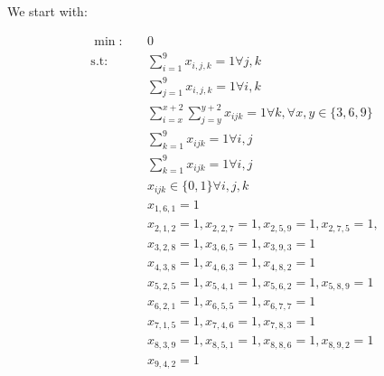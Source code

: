 \documentclass{report}
\begin{document}
We start with: 


\begin{align*}
\min_{}: \quad & 0 \\
\text{s.t}: \quad & \sum_{i=1}^{9} x_{i,j,k} = 1 \forall j, k \\ %
		  & \sum_{j=1}^{9} x_{i,j,k} = 1 \forall i,k \\%
		  & \sum_{i=x}^{x+2} \sum_{j=y}^{y+2} x_{ijk} = 1\forall k, \forall x,y \in \{3,6,9\} \\
		  & \sum_{k=1}^{9} x_{ijk} = 1 \forall i,j\\ %
		  & \sum_{k=1}^{9} x_{ijk} = 1 \forall i,j\\
		  & x_{ijk} \in \{0,1\} \forall i,j,k\\ 
	&x_{1,6,1} = 1 \\ 
	&x_{2,1,2} = 1, 
	x_{2,2,7} = 1,
	x_{2,5,9} = 1, 
	x_{2,7,5} = 1, \\
	&x_{3,2,8} = 1, 
	x_{3,6,5} = 1,
	x_{3,9,3} = 1\\ 
	&x_{4,3,8} = 1, 
	x_{4,6,3} = 1,
	x_{4,8,2} = 1 \\
	&x_{5,2,5} = 1,
	x_{5,4,1} = 1, 
	x_{5,6,2} = 1,
	x_{5,8,9} = 1\\
	&x_{6,2,1} = 1,
	x_{6,5,5} = 1,
	x_{6,7,7} = 1\\
	&x_{7,1,5} = 1,
	x_{7,4,6} = 1,
	x_{7,8,3} = 1\\
	&x_{8,3,9} = 1,
	x_{8,5,1} = 1,
	x_{8,8,6} = 1,
	x_{8,9,2} = 1\\
	&x_{9,4,2} = 1\\
\end{align*}
\end{document}

